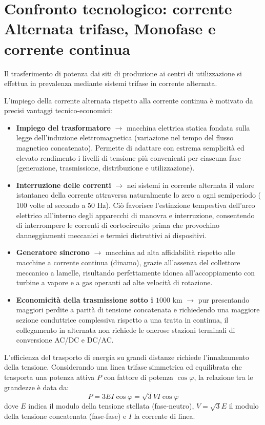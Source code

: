 \newpage
\section{Confronto tecnologico: corrente Alternata trifase, Monofase e corrente continua}
Il trasferimento di potenza dai siti di produzione ai centri di utilizzazione si effettua in prevalenza mediante sistemi trifase in corrente alternata. 

L'impiego della corrente alternata rispetto alla corrente continua è motivato da precisi vantaggi tecnico-economici:
\begin{itemize}
    \item \textbf{Impiego del trasformatore} $\rightarrow$ macchina elettrica statica fondata sulla legge dell'induzione elettromagnetica (variazione nel tempo del flusso magnetico concatenato). Permette di adattare con estrema semplicità ed elevato rendimento i livelli di tensione più convenienti per ciascuna fase (generazione, trasmissione, distribuzione e utilizzazione).
    \item \textbf{Interruzione delle correnti} $\rightarrow$ nei sistemi in corrente alternata il valore istantaneo della corrente attraversa naturalmente lo zero a ogni semiperiodo ($100$ volte al secondo a $50\text{ Hz}$). Ciò favorisce l'estinzione tempestiva dell'arco elettrico all'interno degli apparecchi di manovra e interruzione, consentendo di interrompere le correnti di cortocircuito prima che provochino danneggiamenti meccanici e termici distruttivi ai dispositivi.
    \item \textbf{Generatore sincrono} $\rightarrow$ macchina ad alta affidabilità rispetto alle macchine a corrente continua (dinamo), grazie all'assenza del collettore meccanico a lamelle, risultando perfettamente idonea all'accoppiamento con turbine a vapore e a gas operanti ad alte velocità di rotazione.
    \item \textbf{Economicità della trasmissione sotto i $1000\text{ km}$} $\rightarrow$ pur presentando maggiori perdite a parità di tensione concatenata e richiedendo una maggiore sezione conduttrice complessiva rispetto a una tratta in continua, il collegamento in alternata non richiede le onerose stazioni terminali di conversione AC/DC e DC/AC.
\end{itemize}

L'efficienza del trasporto di energia su grandi distanze richiede l'innalzamento della tensione. Considerando una linea trifase simmetrica ed equilibrata che trasporta una potenza attiva $P$ con fattore di potenza $\cos\varphi$, la relazione tra le grandezze è data da:
\[P = 3 E I \cos\varphi = \sqrt{3} V I \cos\varphi\]
dove $E$ indica il modulo della tensione stellata (fase-neutro), $V = \sqrt{3} E$ il modulo della tensione concatenata (fase-fase) e $I$ la corrente di linea.

